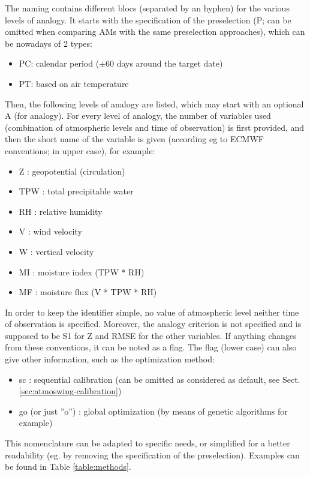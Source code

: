 \documentclass[review]{elsarticle}
\begin{document}
The naming contains different blocs (separated by an hyphen) for the various levels of analogy. It starts with the specification of the preselection (P; can be omitted when comparing AMs with the same preselection approaches), which can be nowadays of 2 types:
\begin{itemize}
	\item PC: calendar period ($\pm 60$ days around the target date)
	\item PT: based on air temperature \citep{BenDaoud2010}
\end{itemize}

Then, the following levels of analogy are listed, which may start with an optional A (for analogy). For every level of analogy, the number of variables used (combination of atmospheric levels and time of observation) is first provided, and then the short name of the variable is given (according eg to ECMWF conventions; in upper case), for example:
\begin{itemize}
	\item Z : geopotential (circulation)
	\item TPW : total precipitable water
	\item RH : relative humidity
	\item V : wind velocity
	\item W : vertical velocity
	\item MI : moisture index (TPW * RH)
	\item MF : moisture flux (V * TPW * RH)
\end{itemize}

In order to keep the identifier simple, no value of atmospheric level neither time of observation is specified. Moreover, the analogy criterion is not specified and is supposed to be S1 for Z and RMSE for the other variables. If anything changes from these conventions, it can be noted as a flag. The flag (lower case) can also give other information, such as the optimization method:
\begin{itemize}
	\item sc : sequential calibration (can be omitted as considered as default, see Sect. \ref{sec:atmoswing-calibration})
	\item go (or just ''o'') : global optimization (by means of genetic algorithms for example)
\end{itemize}

This nomenclature can be adapted to specific needs, or simplified for a better readability (eg. by removing the specification of the preselection). Examples can be found in Table \ref{table:methods}.
\end{document}
